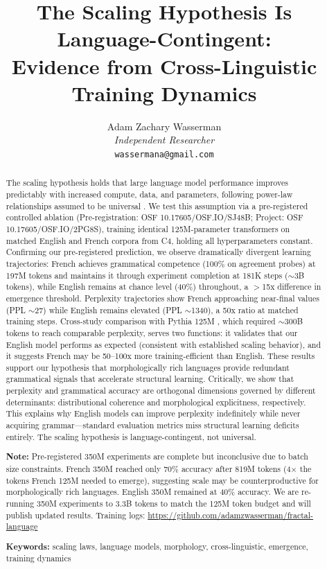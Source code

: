 \documentclass[11pt,a4paper]{article}
\title{The Scaling Hypothesis Is Language-Contingent:\\Evidence from Cross-Linguistic Training Dynamics}
\author{Adam Zachary Wasserman\\
\textit{Independent Researcher}\\
\texttt{wassermana@gmail.com}}
\date{}
\begin{document}
\maketitle

\begin{abstract}
The scaling hypothesis holds that large language model performance improves predictably with increased compute, data, and parameters, following power-law relationships assumed to be universal \citep{kaplan2020scaling,hoffmann2022training}. We test this assumption via a pre-registered controlled ablation (Pre-registration: OSF 10.17605/OSF.IO/SJ48B; Project: OSF 10.17605/OSF.IO/2PG8S), training identical 125M-parameter transformers on matched English and French corpora from C4, holding all hyperparameters constant. Confirming our pre-registered prediction, we observe dramatically divergent learning trajectories: French achieves grammatical competence (100\% on agreement probes) at 197M tokens and maintains it through experiment completion at 181K steps ($\sim$3B tokens), while English remains at chance level (40\%) throughout, a $>$15x difference in emergence threshold. Perplexity trajectories show French approaching near-final values (PPL $\sim$27) while English remains elevated (PPL $\sim$1340), a 50x ratio at matched training steps. Cross-study comparison with Pythia 125M \citep{biderman2023pythia}, which required $\sim$300B tokens to reach comparable perplexity, serves two functions: it validates that our English model performs as expected (consistent with established scaling behavior), and it suggests French may be 50--100x more training-efficient than English. These results support our hypothesis that morphologically rich languages provide redundant grammatical signals that accelerate structural learning. Critically, we show that perplexity and grammatical accuracy are orthogonal dimensions governed by different determinants: distributional coherence and morphological explicitness, respectively. This explains why English models can improve perplexity indefinitely while never acquiring grammar---standard evaluation metrics miss structural learning deficits entirely. The scaling hypothesis is language-contingent, not universal.

\vspace{0.5em}
\noindent\textbf{Note:} Pre-registered 350M experiments are complete but inconclusive due to batch size constraints. French 350M reached only 70\% accuracy after 819M tokens (4$\times$ the tokens French 125M needed to emerge), suggesting scale may be counterproductive for morphologically rich languages. English 350M remained at 40\% accuracy. We are re-running 350M experiments to 3.3B tokens to match the 125M token budget and will publish updated results. Training logs: \url{https://github.com/adamzwasserman/fractal-language}

\vspace{0.5em}
\noindent\textbf{Keywords:} scaling laws, language models, morphology, cross-linguistic, emergence, training dynamics
\end{abstract}
\end{document}
